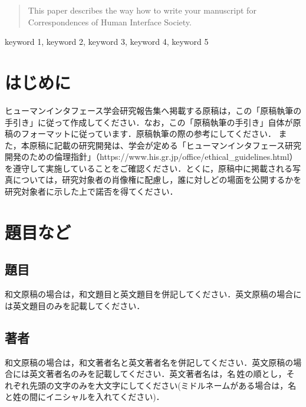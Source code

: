 \documentclass{hisken}
\begin{document}

\begin{abstract}
This paper describes the way how to write your manuscript for Correspondences of Human Interface Society.
\end{abstract}

\begin{keyword}	
keyword 1, keyword 2, keyword 3, keyword 4, keyword 5
\end{keyword}

\maketitle	

\section{はじめに}
ヒューマンインタフェース学会研究報告集へ掲載する原稿は，この「原稿執筆の手引き」に従って作成してください．なお，この「原稿執筆の手引き」自体が原稿のフォーマットに従っています．原稿執筆の際の参考にしてください．
また，本原稿に記載の研究開発は、学会が定める「ヒューマンインタフェース研究開発のための倫理指針」（https://www.his.gr.jp/office/ethical\_guidelines.html） を遵守して実施していることをご確認ください．とくに，原稿中に掲載される写真については，研究対象者の肖像権に配慮し，誰に対しどの場面を公開するかを研究対象者に示した上で諾否を得てください．


\section{題目など}

\subsection{題目}
和文原稿の場合は，和文題目と英文題目を併記してください．英文原稿の場合には英文題目のみを記載してください．

\subsection{著者}
和文原稿の場合は，和文著者名と英文著者名を併記してください．英文原稿の場合には英文著者名のみを記載してください．英文著者名は，名\,姓の順とし，それぞれ先頭の文字のみを大文字にしてください(ミドルネームがある場合は，名と姓の間にイニシャルを入れてください)．
\end{document}
